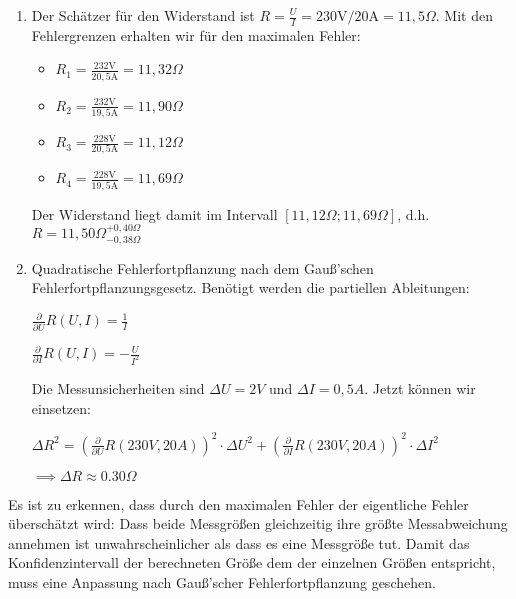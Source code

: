 \item 

\begin{enumerate}

\item Der Schätzer für den Widerstand ist $R=\frac{U}{I} = 230\text{V} / \text{20A} = 11{,}5\Omega$. Mit den Fehlergrenzen erhalten wir für den maximalen Fehler:

\begin{itemize}
\item $R_1 = \frac{232\text{V}}{20{,}5\text{A}} = 11{,}32\Omega$
\item $R_2 = \frac{232\text{V}}{19{,}5\text{A}} = 11{,}90\Omega$
\item $R_3 = \frac{228\text{V}}{20{,}5\text{A}} = 11{,}12\Omega$
\item $R_4 = \frac{228\text{V}}{19{,}5\text{A}} = 11{,}69\Omega$
\end{itemize}

Der Widerstand liegt damit im Intervall $[11{,}12\Omega;11{,}69\Omega]$, d.h. $R = 11{,}50\Omega_{-0{,}38\Omega}^{+0{,}40\Omega}$

\item Quadratische Fehlerfortpflanzung nach dem Gauß'schen Fehlerfortpflanzungsgesetz. Benötigt werden die partiellen Ableitungen:

$\frac{\partial}{\partial U}R(U,I) = \frac{1}{I}$

$\frac{\partial}{\partial I}R(U,I) = -\frac{U}{I^2}$

Die Messunsicherheiten sind $\Delta U =2V$ und $\Delta I = 0,5A$. Jetzt können wir einsetzen:

$\Delta R^2 = (\frac{\partial}{\partial U}R(230V,20A))^2 \cdot \Delta U^2 + ( \frac{\partial}{\partial I}R(230V,20A))^2 \cdot \Delta I^2 $

$\implies \Delta R \approx 0.30\Omega$

\end{enumerate}

Es ist zu erkennen, dass durch den maximalen Fehler der eigentliche Fehler überschätzt wird: Dass beide Messgrößen gleichzeitig ihre größte Messabweichung annehmen ist unwahrscheinlicher als dass es eine Messgröße tut. Damit das Konfidenzintervall der berechneten Größe dem der einzelnen Größen entspricht, muss eine Anpassung nach Gauß'scher Fehlerfortpflanzung geschehen.
